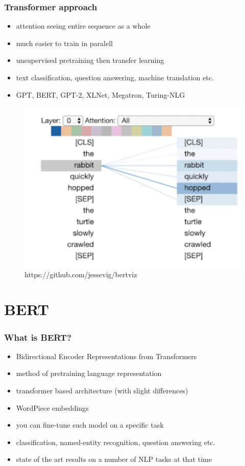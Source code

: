 \documentclass{beamer}
\begin{document}
\begin{frame}
    \frametitle{Transformer approach}
    \begin{itemize}
        \item attention seeing entire sequence as a whole
        \item much easier to train in paralell
        \item unsupervised pretraining then transfer learning
        \item text classification, question answering, machine translation etc.
        \item GPT, BERT, GPT-2, XLNet, Megatron, Turing-NLG
    \end{itemize}

    \begin{figure}[hbt!]
    \includegraphics[scale=0.3]{images/attention.png}
    \caption{https://github.com/jessevig/bertviz}
    \end{figure}
\end{frame}

\section[Section]{BERT}

\begin{frame}
    \frametitle{What is BERT?}
    \begin{itemize}
        \item Bidirectional Encoder Representations from Transformers \parencite{devlin2018bert}
        \item method of pretraining language representation
        \item transformer based architecture (with slight differences)
        \item WordPiece embeddings
        \item you can fine-tune such model on a specific task
        \item classification, named-entity recognition, question answering etc.
        \item state of the art results on a number of NLP tasks at that time
    \end{itemize}
\end{frame}
\end{document}
